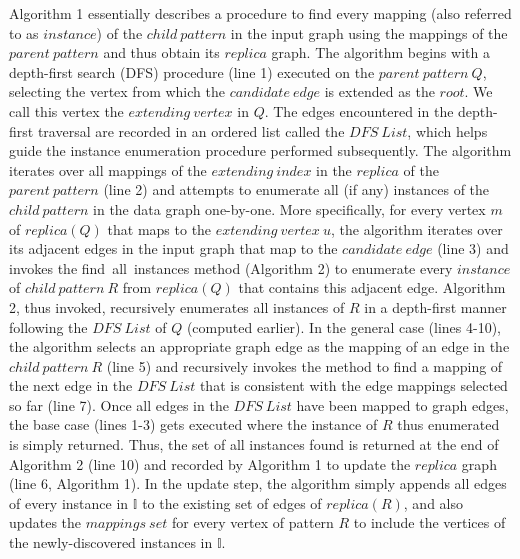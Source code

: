 Algorithm 1 essentially describes a procedure to find every mapping (also referred to as $instance$) of the $child\ pattern$ in the input graph using the mappings of the $parent\ pattern$ and thus obtain its $replica$ graph. The algorithm begins with a depth-first search ({\sf DFS}) procedure (line 1) executed on the $parent\ pattern\ Q$, selecting the vertex from which the $candidate\ edge$ is extended as the $root$. We call this vertex the $extending\ vertex$ in $Q$. The edges encountered in the depth-first traversal are recorded in an ordered list called the $DFS\ List$, which helps guide the instance enumeration procedure performed subsequently. The algorithm iterates over all mappings of the $extending\ index$ in the $replica$ of the $parent\ pattern$ (line 2) and attempts to enumerate all (if any) instances of the $child\ pattern$ in the data graph one-by-one. More specifically, for every vertex $m$ of $replica(Q)$ that maps to the $extending\ vertex\ u$, the algorithm iterates over its adjacent edges in the input graph that map to the $candidate\ edge$ (line 3) and invokes the {\sf find\ all\ instances} method (Algorithm 2) to enumerate every $instance$ of $child\ pattern\ R$ from $replica(Q)$ that contains this adjacent edge. Algorithm 2, thus invoked, recursively enumerates all instances of $R$ in a depth-first manner following the $DFS\ List$ of $Q$ (computed earlier). In the general case (lines 4-10), the algorithm selects an appropriate graph edge as the mapping of an edge in the $child\ pattern\ R$ (line 5) and recursively invokes the method to find a mapping of the next edge in the $DFS\ List$ that is consistent with the edge mappings selected so far (line 7). Once all edges in the $DFS\ List$ have been mapped to graph edges, the base case (lines 1-3) gets executed where the instance of $R$ thus enumerated is simply returned. Thus, the set of all instances found is returned at the end of Algorithm 2 (line 10) and recorded by Algorithm 1 to update the $replica$ graph (line 6, Algorithm 1). In the update step, the algorithm simply appends all edges of every instance in $\mathbb{I}$ to the existing set of edges of $replica(R)$, and also updates the $mappings\ set$ for every vertex of pattern $R$ to include the vertices of the newly-discovered instances in $\mathbb{I}$.

